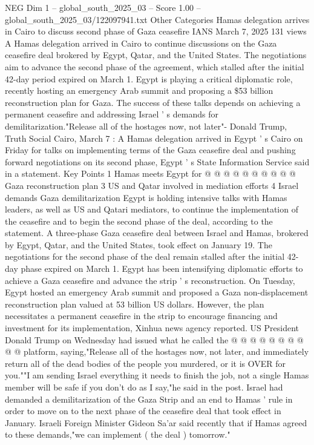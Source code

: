 \begin{textsample}{NEG Dim 1 – global\_south\_2025\_03 – Score 1.00 – global\_south\_2025\_03/122097941.txt}  \label{ex:f1_neg_182}
Other Categories Hamas delegation arrives in Cairo to discuss second phase of Gaza ceasefire IANS March 7, 2025 131 views A Hamas delegation arrived in Cairo to continue discussions on the Gaza ceasefire deal brokered by Egypt, Qatar, and the United States.
The negotiations aim to advance the second phase of the agreement, which stalled after the initial 42-day period expired on March 1.
Egypt is playing a critical diplomatic role, recently hosting an emergency Arab summit and proposing a \$53 billion reconstruction plan for Gaza.
The success of these talks depends on achieving a permanent ceasefire and addressing Israel ' s demands for demilitarization."Release all of the hostages now, not later"- Donald Trump, Truth Social Cairo, March 7 : A Hamas delegation arrived in Egypt ' s Cairo on Friday for talks on implementing terms of the Gaza ceasefire deal and pushing forward negotiations on its second phase, Egypt ' s State Information Service said in a statement.
Key Points 1 Hamas meets Egypt for @ @ @ @ @ @ @ @ @ @ Gaza reconstruction plan 3 US and Qatar involved in mediation efforts 4 Israel demands Gaza demilitarization Egypt is holding intensive talks with Hamas leaders, as well as US and Qatari mediators, to continue the implementation of the ceasefire and to begin the second phase of the deal, according to the statement.
A three-phase Gaza ceasefire deal between Israel and Hamas, brokered by Egypt, Qatar, and the United States, took effect on January 19.
The negotiations for the second phase of the deal remain stalled after the initial 42-day phase expired on March 1.
Egypt has been intensifying diplomatic efforts to achieve a Gaza ceasefire and advance the strip ' s reconstruction.
On Tuesday, Egypt hosted an emergency Arab summit and proposed a Gaza non-displacement reconstruction plan valued at 53 billion US dollars.
However, the plan necessitates a permanent ceasefire in the strip to encourage financing and investment for its implementation, Xinhua news agency reported.
US President Donald Trump on Wednesday had issued what he called the @ @ @ @ @ @ @ @ @ @ platform, saying,"Release all of the hostages now, not later, and immediately return all of the dead bodies of the people you murdered, or it is OVER for you.""I am sending Israel everything it needs to finish the job, not a single Hamas member will be safe if you don't do as I say,"he said in the post.
Israel had demanded a demilitarization of the Gaza Strip and an end to Hamas ' rule in order to move on to the next phase of the ceasefire deal that took effect in January.
Israeli Foreign Minister Gideon Sa'ar said recently that if Hamas agreed to these demands,"we can implement ( the deal ) tomorrow."

\end{textsample}
